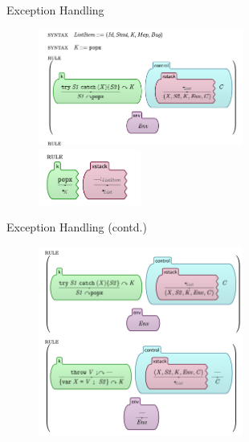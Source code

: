 \documentclass{beamer}
\begin{document}
\begin{frame}{Exception Handling}
    \begin{figure}[H]
        \centering
    \includegraphics[width=0.6\textwidth]{trycatch} \\
    \includegraphics[width=0.3\textwidth]{pop} \\
    \end{figure}
\end{frame}
\begin{frame}{Exception Handling (contd.)}
    \begin{figure}[H]
        \centering
    \includegraphics[width=0.6\textwidth]{throw} \\
    \end{figure}
\end{frame}

\end{document}
